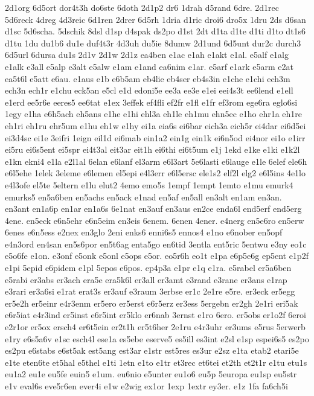 {2d1org
6d5ort
dor4t3h
do6ste
6doth
2d1p2
dr6
1drah
d5rand
6dre.
2d1rec
5d6reck
4dreg
4d3reic
6d1ren
2drer
6d5rh
1dria
d1ric
droi6
dro5x
1dru
2ds
d6san
d1sc
5d6scha.
5dschik
8dsl
d1sp
d4spak
ds2po
d1st
2dt
d1ta
d1te
d1ti
d1to
dt1s6
d1tu
1du
du1b6
du1e
duf4t3r
4d3uh
du5ie
8dumw
2d1und
6d5unt
dur2c
durch3
6d5url
6dursa
du1s
2d1v
2d1w
2d1z
ea4ben
e1ac
e1ah
e1akt
e1al.
e5alf
e1alg
e1alk
e3all
e5alp
e3alt
e5alw
e1am
e1and
ea6nim
e1ar.
e5arf
e1ark
e5arm
e2at
ea5t6l
e5att
e6au.
e1aus
e1b
e6b5am
eb4lie
eb4ser
eb4s3in
e1che
e1chi
ech3m
ech3n
ech1r
e1chu
eck5an
e5cl
e1d
edoni5e
ee3a
ee3e
e1ei
eei4s3t
ee6lend
e1ell
e1erd
ee5r6e
eeres5
ee6tat
e1ex
3effek
ef4fli
ef2fr
e1fl
e1fr
ef3rom
ege6ra
eglo6si
1egy
e1ha
e6h5ach
eh5ans
e1he
e1hi
ehl3a
eh1le
eh1mu
ehn5ec
e1ho
ehr1a
eh1re
eh1ri
eh1ru
ehr5um
e1hu
eh1w
e1hy
ei1a
eia6s
ei6bar
eich3a
eich5r
ei4dar
ei6d5ei
ei3d4sc
ei1e
3eifri
1eign
eil1d
ei6mab
ein1a2
ein1g
ein1k
ei6n5od
ei4nor
ei1o
e1irr
ei5ru
ei6s5ent
ei5spr
ei4t3al
eit3ar
eit1h
ei6thi
ei6t5um
e1j
1ekd
e1ke
e1ki
e1k2l
e1kn
ekni4
e1la
e2l1al
6elan
e6lanf
el3arm
e6l3art
5e6lasti
e6lauge
e1le
6elef
ele6h
e6l5ehe
1elek
3eleme
e6lemen
el5epi
e4l3err
e6l5ersc
ele1s2
elf2l
elg2
e6l5ins
4e1lo
e4l3ofe
el5te
5eltern
e1lu
elut2
4emo
emo5s
1empf
1empt
1emto
e1mu
emurk4
emurks5
en5a6ben
en5achs
en5ack
e1nad
en5af
en5all
en3alt
en1am
en3an.
en3ant
en1a6p
en1ar
en1a6s
6e1nat
en3auf
en3aus
en2ce
enda6l
end5erf
end5erg
4ene.
en5eck
e6n5ehr
e6n5eim
en3eis
6enem.
6enen
4ener.
e4nerg
en5e6ro
en5erw
6enes
e6n5ess
e2nex
en3glo
2eni
enks6
enni6s5
ennos4
e1no
e6nober
en5opf
e4n3ord
en4san
en5s6por
en5t6ag
enta5go
en6tid
3entla
ent5ric
5entwu
e3ny
eo1c
e5o6fe
e1on.
e3onf
e5onk
e5onl
e5ops
e5or.
eo5r6h
eo1t
e1pa
e6p5e6g
ep5ent
e1p2f
e1pi
5epid
e6pidem
e1pl
5epos
e6pos.
ep4p3a
e1pr
e1q
e1ra.
e5rabel
er5a6ben
e5rabi
er3abs
er3ach
era5e
era5k6l
er3all
er3amt
e3rand
e3rane
er3ans
e1rap
e3rari
er3a6si
e1rat
erat3s
er3auf
e3raum
3erbse
er1c
2e1re
e5re.
er3eck
er5egg
er5e2h
er5einr
e4r3enm
er5ero
er5erst
e6r5erz
er3ess
5ergebn
er2gh
2e1ri
eri5ak
e6r5iat
e4r3ind
er5inst
e6r5int
er5klo
er6nab
3ernst
e1ro
6ero.
er5obs
er1o2f
6eroi
e2r1or
er5ox
ersch4
er6t5ein
er2t1h
er5t6her
2e1ru
e4r3uhr
er3ums
e5rus
5erwerb
e1ry
e6s5a6v
e1sc
esch4l
ese1a
es5ebe
eserve5
es5ill
es3int
e2sl
e1sp
espei6s5
es2po
es2pu
e6stabs
e6st5ak
est5ang
est3ar
e1str
est5res
es3ur
e2sz
e1ta
etab2
etari5e
e1te
eten6te
et5hal
e5thel
e1ti
1etn
e1to
e1tr
et3rec
et6tei
et2th
et2t1r
e1tu
etu1s
eu1a2
eu1e
eu5fe
euin5
e1um.
eu6nio
e5unter
eu1o6
eu5p
5europa
eu1sp
eu5str
e1v
eval6s
eve5r6en
ever4i
e1w
e2wig
ex1or
1exp
1extr
ey3er.
e1z
1fa
fa6ch5i
}

